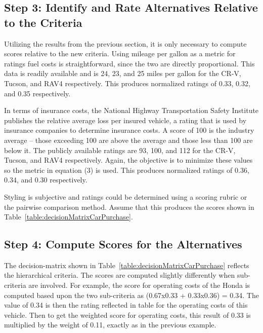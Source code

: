 \subsection*{Step 3: Identify and Rate Alternatives Relative to the Criteria}

Utilizing the results from the previous section, it is only necessary to
compute scores relative to the new criteria. Using mileage per gallon as
a metric for ratings fuel costs is straightforward, since the two are
directly proportional. This data is readily available and is 24, 23, and
25 miles per gallon for the CR-V, Tucson, and RAV4 respectively. This
produces normalized ratings of 0.33, 0.32, and 0.35 respectively.

In terms of insurance costs, the National Highway Transportation Safety
Institute publishes the relative average loss per insured vehicle, a
rating that is used by insurance companies to determine insurance costs.
A score of 100 is the industry average -- those exceeding 100 are above
the average and those less than 100 are below it. The publicly available
ratings are 93, 100, and 112 for the CR-V, Tucson, and RAV4
respectively. Again, the objective is to minimize these values so the
metric in equation (3) is used. This produces normalized ratings of
0.36, 0.34, and 0.30 respectively.

Styling is subjective and ratings could be determined using a scoring
rubric or the pairwise comparison method. Assume that this produces the
scores shown in Table~\ref{table:decisionMatrixCarPurchase}.

\subsection*{Step 4: Compute Scores for the Alternatives}

The decision-matrix shown in Table~\ref{table:decisionMatrixCarPurchase} reflects the hierarchical
criteria. The scores are computed slightly differently when sub-criteria
are involved. For example, the score for operating costs of the Honda is
computed based upon the two sub-criteria as (0.67x0.33 + 0.33x0.36) =
0.34. The value of 0.34 is then the rating reflected in table for the
operating costs of this vehicle. Then to get the weighted score for
operating costs, this result of 0.33 is multiplied by the weight of
0.11, exactly as in the previous example.


